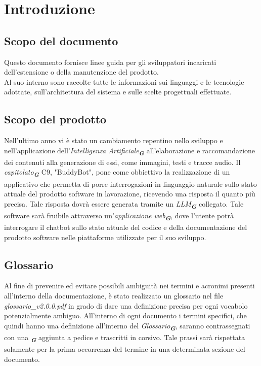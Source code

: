 

\section{Introduzione}
\label{sec:introduzione}

\subsection{Scopo del documento}
Questo documento fornisce linee guida per gli sviluppatori incaricati dell'estensione o della manutenzione del prodotto.\\
Al suo interno sono raccolte tutte le informazioni sui linguaggi e le tecnologie adottate, sull’architettura del sistema e sulle
scelte progettuali effettuate.

\subsection{Scopo del prodotto}
Nell’ultimo anno vi è stato un cambiamento repentino nello sviluppo e nell’applicazione
dell’\emph{Intelligenza Artificiale}\textsubscript{\textbf{\textit{G}}} all’elaborazione e raccomandazione dei contenuti alla
generazione
di essi, come immagini, testi e tracce audio.
Il \emph{capitolato}\textsubscript{\textbf{\textit{G}}} C9, "BuddyBot", pone come obbiettivo la realizzazione di un applicativo che
permetta di porre interrogazioni in
linguaggio naturale sullo stato attuale del prodotto software in lavorazione, ricevendo una risposta il quanto più precisa. Tale
risposta dovrà essere generata tramite un \emph{LLM}\textsubscript{\textbf{\textit{G}}} collegato. Tale software sarà fruibile
attraverso un'\emph{applicazione web}\textsubscript{\textbf{\textit{G}}}, dove l'utente potrà interrogare il chatbot sullo stato
attuale del codice e della documentazione del prodotto software nelle piattaforme
utilizzate per il suo sviluppo.

\subsection{Glossario}
Al fine di prevenire ed evitare possibili ambiguità nei termini e acronimi presenti all’interno della documentazione, è stato
realizzato un glossario nel file \emph{glossario\_v2.0.0.pdf} in grado di dare una definizione precisa per ogni vocabolo potenzialmente
ambiguo. All’interno di ogni documento i termini specifici, che quindi hanno una definizione all’interno del 
\emph{Glossario}\textsubscript{\textbf{\textit{G}}}, saranno
contrassegnati con una \textsubscript{\textbf{\textit{G}}} aggiunta a pedice e trascritti in corsivo. Tale prassi sarà rispettata
solamente per la prima occorrenza del termine in una determinata sezione del documento.

